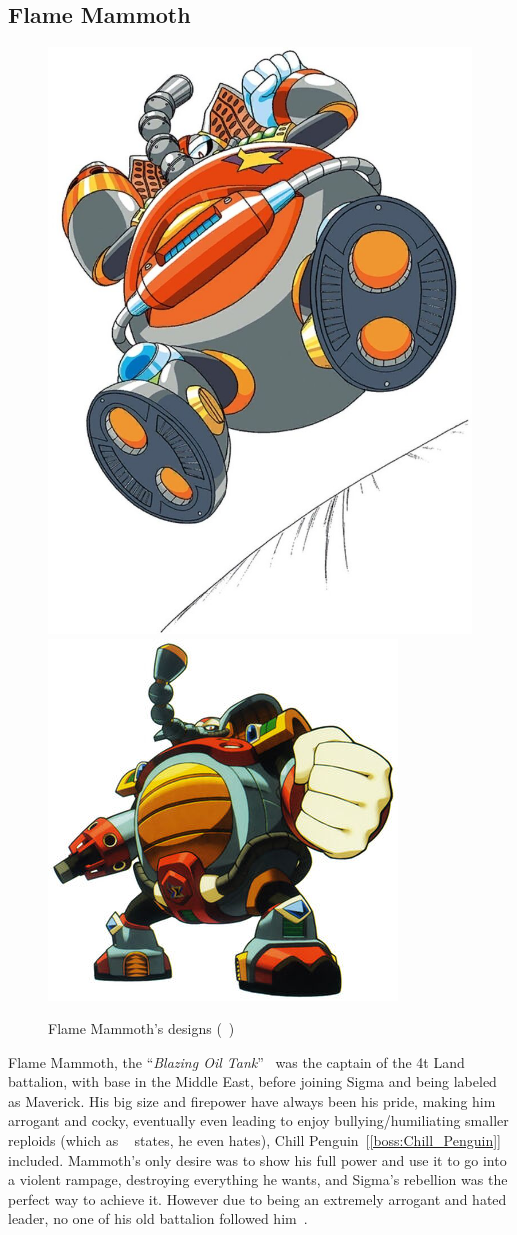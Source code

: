 \subsection{Flame Mammoth}\label{boss:Flame_mammoth}
\begin{figure}[htp]
	\centering
	\includegraphics[width=0.3\linewidth]{figures/X1/Flame_mammoth/Flame_mammoth.jpg}
	\includegraphics[width=0.4\linewidth]{figures/X1/Flame_mammoth/MHXFlameMammoth.jpg}
	\caption{Flame Mammoth's designs (~\cite{book:MMX_Complete_art})}
\end{figure}
Flame Mammoth, the ``\textit{Blazing Oil Tank}''~\cite{book:MMX_Complete_art} was the captain of the 4t Land battalion, with base in the Middle East, before joining Sigma and being labeled as Maverick. His big size and firepower have always been his pride, making him arrogant and cocky, eventually even leading to enjoy bullying/humiliating smaller reploids (which as ~\cite{wayback:X_resources} states, he even hates), Chill Penguin~[\ref{boss:Chill_Penguin}]~\cite{wiki:Flame_mammoth} included. Mammoth's only desire was to show his full power and use it to go into a violent rampage, destroying everything he wants, and Sigma's rebellion was the perfect way to achieve it. However due to being an extremely arrogant and hated leader, no one of his old battalion followed him~\cite{MHX:manual}.

